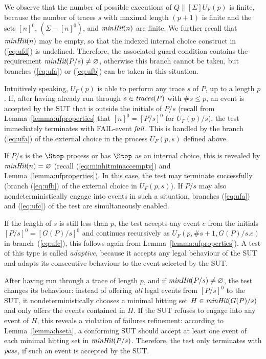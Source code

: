 We observe that the number of possible executions of $Q\parallel[\Sigma]
U_F(p)$ is finite, because the number of traces $s$ with maximal length
$(p+1)$ is finite and the sets $[n]^0$, $(\Sigma - [n]^0)$, and
$\text{\it minHit}(n)$ are finite. We further recall that $\text{\it minHit}(n)$ may be
empty, so that the indexed internal choice construct in (\ref{eq:ufd}) 
is undefined. Therefore, the associated guard condition contains the requirement
$\text{\it minHit}(P/s)\neq\varnothing$, otherwise this branch cannot be taken,
but branches (\ref{eq:ufa}) or (\ref{eq:ufb}) can be taken in this situation.

Intuitively speaking, $U_F(p)$ is able to perform any trace $s$ of $P$, up to
a length $p$. If, after having already run through $s\in\text{\it traces}(P)$ with
$\#s \le p$, an event is accepted by the SUT that is outside the initials of $P/s$
 (recall from Lemma~\ref{lemma:ufproperties} that $[n]^0 = [P/s]^0$ for $U_F(p)/s$),
the test immediately terminates with FAIL-event ${\text{\it fail}}$. This is handled by
the branch (\ref{eq:ufa}) of the external choice in the process $U_F(p,s)$
defined above.

If $P/s$ is the $\Stop$ process or has $\Stop$ as an internal choice,
this is revealed by $\text{\it minHit}(n) = \varnothing$ (recall (\ref{eq:minhitminaccempty}) and
Lemma~\ref{lemma:ufproperties}). 
In this case, the test may terminate successfully (branch (\ref{eq:ufb}) of
the external choice in $U_F(p,s)$). If $P/s$ may also nondeterministically engage into events in such a situation, branches  (\ref{eq:ufa}) and (\ref{eq:ufc}) of the test are
simultaneously enabled.


If the length of $s$ is still less than $p$, the test accepts any event $e$ from
the initials $[P/s]^0 = [G(P)/s]^0$ and continues recursively as $U_F(p,\#s+1,G(P)/s.e)$ in
branch~(\ref{eq:ufc}), this follows again from  Lemma~\ref{lemma:ufproperties}). 
A test of this type is called \emph{adaptive}, because
it accepts any legal behaviour of the SUT and adapts its consecutive
behaviour to the event selected by the SUT.

After having run through a trace of length $p$, and if
$\text{\it minHit}(P/s)\neq \varnothing$, the test changes its behaviour: instead of
offering {\it all} legal events from $[P/s]^0$ to the SUT, it
nondeterministically chooses a minimal hitting set   $H\in \text{\it minHit}(G(P)/s)$ 
and
only offers the events contained in $H$. If the SUT refuses to engage
into any event of $H$, this reveals a violation of failures refinement:
according to Lemma~\ref{lemma:hseta}, a conforming SUT should accept at least
one event of each minimal hitting set in $\text{\it minHit}(P/s)$. Therefore, the test
only terminates with  ${\text{\it pass}}$, if such an event is accepted by the SUT.

